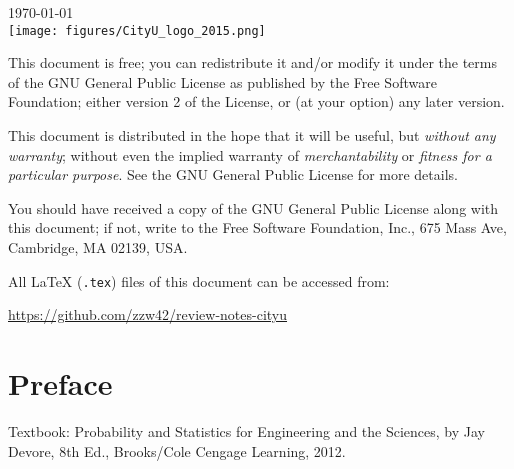 \documentclass[UTF8,a4paper,10pt,openany]{book}
\theoremstyle{plain}
\theoremstyle{definition}
\begin{document}
\begin{titlepage}



{\large \today}\\[2cm] %

\vspace{5cm}
\texttt{[image: figures/CityU\_logo\_2015.png]}\\[1cm] %


\vfill %
\end{titlepage}

\noindent

This document is free; you can redistribute it and/or modify it under the terms of the GNU General Public License as published by the Free Software Foundation; either version 2 of the License, or (at your option) any later version.

This document is distributed in the hope that it will be useful, but \emph{without any warranty}; without even the implied warranty of \emph{merchantability} or \emph{fitness for a particular purpose}. See the GNU General Public License for more details.

You should have received a copy of the GNU General Public License along with this document; if not, write to the Free Software Foundation, Inc., 675 Mass Ave, Cambridge, MA 02139, USA.

All \LaTeX{} (\texttt{.tex}) files of this document can be accessed from:

\url{https://github.com/zzw42/review-notes-cityu}

\chapter*{Preface}
\textsf{
Textbook: Probability and Statistics for Engineering and the Sciences, by Jay Devore, 8th Ed., Brooks/Cole Cengage Learning, 2012. }
\\
\end{document}
